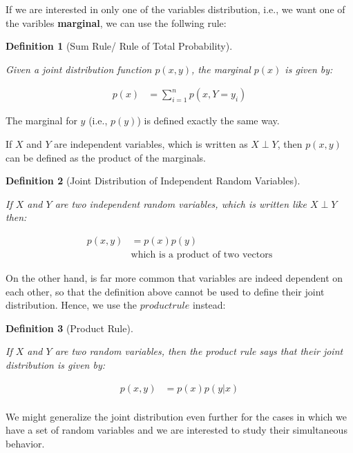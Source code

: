 \documentclass{article}
\newtheorem{definition}{Definition}[section]
\begin{document}
If we are interested in only one of the variables distribution, i.e., we want one of the varibles \textbf{marginal}, we can use the follwing rule:

\begin{definition}[Sum Rule/ Rule of Total Probability]
	\label{def:sum_rule}
	
	Given a joint distribution function  $p(x,y)$, the marginal $p(x)$ is given by:
 	
	\begin{align}
		p(x) &= \sum_{i = 1}^{n} p(x, Y = y_i)
	\end{align}
	
\end{definition}

The marginal for $y$ (i.e., $p(y)$) is defined exactly the same way.

If $X$ and $Y$ are independent variables, which is written as $X \perp Y$, then  $p(x,y)$ can be defined as the product of the marginals.

\begin{definition}[Joint Distribution of Independent Random Variables]
	\label{def:joint_dist_of_indep_rvs}
	
	If $X$ and $Y$ are two independent random variables, which is written like  $X \perp Y$ then:
	
	\begin{align}
		p(x,y) &= p(x)p(y)\\
		& \text{which is a product of two vectors}
	\end{align}
	
\end{definition}

On the other hand, is far more common that variables are indeed dependent on each other, so that the definition above cannot be used to define their joint distribution. Hence, we use the $product rule$ instead:


\begin{definition}[Product Rule]
	\label{def:prod_rule}
	
	If $X$ and $Y$ are two random variables, then the product rule says that their joint distribution is given by:
	
	\begin{align}
		p(x,y) &= p(x)p(y|x)\\
	\end{align}
	
\end{definition}


We might generalize the joint distribution even further for the cases in which we have a set of random variables and we are interested to study their simultaneous behavior.
\end{document}
